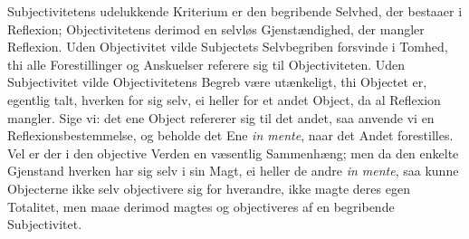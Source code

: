 \documentclass[12pt]{book}
\newcommand{\opage}[1]{\marginnote{\footnotesize\textit{[#1]}}}
\begin{document}
Subjectivitetens udelukkende Kriterium er den begribende Selvhed, der bestaaer i
Reflexion; Objectivitetens derimod en selvløs Gjenstændighed, der mangler Reflexion. Uden
Objectivitet vilde Subjectets Selvbegriben forsvinde i Tomhed, thi alle Forestillinger og
Anskuelser referere sig til Objectiviteten. Uden Subjectivitet vilde Objectivitetens Begreb
\opage{205} %
%
%
%
%
være utænkeligt, thi Objectet er, egentlig talt, hverken for sig selv, ei heller for et
andet Object, da al Reflexion mangler. Sige vi: det ene Object refererer sig til det
andet, saa anvende vi en Reflexionsbestemmelse, og beholde det Ene \textit{in mente},
naar det Andet forestilles. Vel er der i den objective Verden en væsentlig Sammenhæng;
men da den enkelte Gjenstand hverken har sig selv i sin Magt, ei heller de andre
\textit{in mente}, saa kunne Objecterne ikke selv objectivere sig for hverandre, ikke
magte deres egen Totalitet, men maae derimod magtes og objectiveres af en begribende
Subjectivitet.
\end{document}
